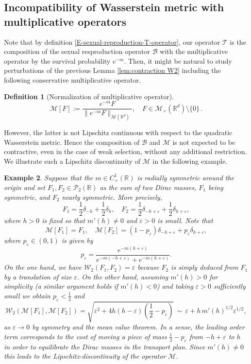 \documentclass[reqno]{amsart}
\newtheorem{definition}{Definition}[section]
\newtheorem{example}[definition]{Example}
\numberwithin{equation}{section}
\begin{document}
{\subsection{Incompatibility of Wasserstein metric with multiplicative operators} Note that by definition \eqref{E-sexual-reproduction-T-operator}, our operator $\mathcal{T}$ is the composition of the sexual resproduction operator $\mathcal{B}$ with the multiplicative operator by the survival probability $e^{-m}$. Then, it might be natural to study perturbations of the previous Lemma \ref{lem:contraction W2} including the following conservative multiplicative operator.

\begin{definition}[Normalization of multiplicative operator]\label{D-operator-M}
$$
\mathcal{M}[F]:=\dfrac{e^{-m} F}{\|e^{-m} F\|_{\mathcal{M}(\mathbb{R}^d)}},\quad F\in \mathcal{M}_+(\mathbb{R}^d)\setminus \{0\}\, .
$$
\end{definition}

However, the latter is not Lipschitz continuous with respect to the quadratic Wasserstein metric. Hence the composition of $\mathcal B$ and $\mathcal M$ is not expected to be contractive, even in the case of weak selection, without any additional restriction. We illustrate such a Lipschitz discontinuity of $\mathcal M$ in the following example.

\begin{example}\label{ex:incompatibility}
Suppose that the $m\in C^1_+(\mathbb{R})$ is radially symmetric around the origin and set $F_1, F_2\in \mathcal{P}_2(\mathbb{R})$ as the sum of two Dirac masses, $F_1$ being symmetric, and $F_2$ nearly symmetric. More precisely,
$$F_1 = \frac{1}{2} \delta_{-h} +  \frac{1}{2} \delta_h,\quad F_2  = \frac{1}{2} \delta_{-h+\varepsilon} +  \frac{1}{2} \delta_{h+\varepsilon},$$
where $h>0$ is fixed so that $m'(h)\neq 0$ and $\varepsilon>0$ is small. Note that 
$$\mathcal M[F_1] = F_1,\quad \mathcal M[F_2] = (1-p_\varepsilon) \delta_{-h+\varepsilon} +  p_\varepsilon\delta_{h+\varepsilon},$$
where $p_\varepsilon\in (0,1)$ is given by
$$p_\varepsilon= \dfrac{e^{-m(h+\varepsilon)}}{e^{-m(-h+\varepsilon)}+ e^{-m(h+\varepsilon)}}.$$
On the one hand, we have $\mathcal{W}_2(F_1,F_2) = \varepsilon$ because $F_2$ is simply deduced from $F_1$ by a translation of size $\varepsilon$. On the other hand, assuming $m'(h)>0$ for simplicity (a similar argument holds if $m'(h)<0$) and taking $\varepsilon>0$ sufficiently small we obtain $p_\varepsilon<\frac{1}{2}$ and
$$\mathcal{W}_2(\mathcal{M}[F_1],\mathcal{M}[F_2]) = \sqrt{\varepsilon^2+4h(h-\varepsilon)\left(\frac{1}{2}-p_\varepsilon\right)}\,\sim\, \varepsilon+h\,m'(h)^{1/2}\varepsilon^{1/2},$$
as $\varepsilon\rightarrow 0$ by symmetry and the mean value theorem. In a sense, the leading order term corresponds to the cost of moving a piece of mass $\frac{1}{2}-p_\varepsilon$ from $-h+\varepsilon$ to $h$ in order to equilibrate the Dirac masses in the transport plan. Since $m'(h)\neq 0$ this leads to the Lipschitz-discontinuity of the operator $\mathcal{M}$.
\end{example}

}
\end{document}
